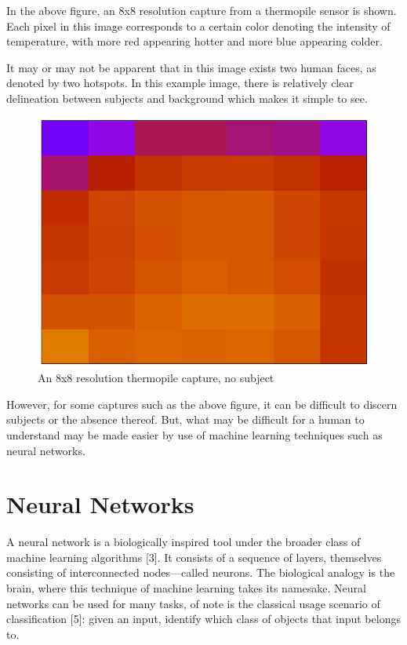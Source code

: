 \documentclass[a4paper,12pt]{article}
\begin{document}
\pagebreak

In the above figure, an 8x8 resolution capture from a thermopile sensor is shown. Each pixel in this image corresponds to a certain color denoting the intensity of temperature, with more red appearing hotter and more blue appearing colder.

It may or may not be apparent that in this image exists two human faces, as denoted by two hotspots. In this example image, there is relatively clear delineation between subjects and background which makes it simple to see.

\begin{figure}[h!]
\centering
\includegraphics[scale=0.35]{images/heat4.png}
\caption{An 8x8 resolution thermopile capture, no subject}
\label{fig:heatmap4}
\end{figure}

However, for some captures such as the above figure, it can be difficult to discern subjects or the absence thereof. But, what may be difficult for a human to understand may be made easier by use of machine learning techniques such as neural networks.

\section{Neural Networks}

A neural network is a biologically inspired tool under the broader class of machine learning algorithms [3]. It consists of a sequence of layers, themselves consisting of interconnected nodes---called neurons. The biological analogy is the brain, where this technique of machine learning takes its namesake. Neural networks can be used for many tasks, of note is the classical usage scenario of classification [5]: given an input, identify which class of objects that input belongs to.
\end{document}
